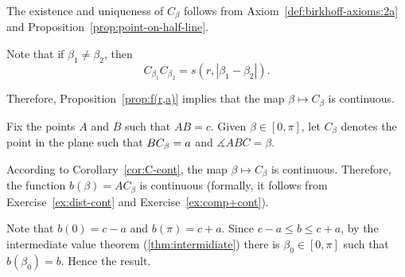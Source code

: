 The existence and uniqueness of $C_\beta$ follows from Axiom~\ref{def:birkhoff-axioms:2a} and Proposition~\ref{prop:point-on-half-line}.

Note that if $\beta_1\ne\beta_2$, then
$$C_{\beta_1}C_{\beta_2}=s(r,|\beta_1-\beta_2|).$$

Therefore, Proposition~\ref{prop:f(r,a)} implies that  the map $\beta\mapsto C_\beta$ is continuous.
\qeds





\label{page:proof:thm:abc}
Fix the points $A$ and $B$ such that $AB=c$.
Given $\beta\in [0,\pi]$,
let $C_\beta$ denotes the point in the plane such that $BC_\beta\z=a$ and $\measuredangle ABC=\beta$.

According to Corollary~\ref{cor:C-cont},
the map
$\beta\mapsto C_\beta$ is continuous.
Therefore, the function $b(\beta)=AC_\beta$ is continuous
(formally, it follows from Exercise~\ref{ex:dist-cont} and Exercise~\ref{ex:comp+cont}).

Note that $b(0)=c-a$ and $b(\pi)=c+a$.
Since $c-a\le b\le c+a$,
by the intermediate value theorem (\ref{thm:intermidiate})
there is $\beta_0\in[0,\pi]$ such that
$b(\beta_0)=b$.
Hence the result. 
\qeds



